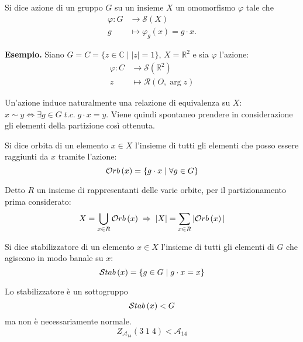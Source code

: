 \begin{multicols}{2}
\begin{definition}[Azione]
	Si dice azione di un gruppo $ G $ su un insieme $ X $ un omomorfismo $ \varphi $ tale che \begin{align*}
	\varphi \colon G &\to \mathcal{S}\left(X\right) \\
	g &\mapsto \varphi_g(x) = g \cdot x.
	\end{align*}
\end{definition}

\textbf{Esempio.} Siano $ G = C = \{ z \in \mathbb{C} \mid |z| = 1 \} $, $ X = \mathbb{R}^2 $ e sia $ \varphi $ l'azione: \begin{align*}
\varphi \colon C &\to \mathcal{S}\left(\mathbb{R}^2\right) \\
z &\mapsto \mathcal{R}(O, \arg z)
\end{align*}

\begin{remark}
	Un'azione induce naturalmente una relazione di equivalenza su $ X $: $ x \sim y \Leftrightarrow \exists g \in G \; t.c.\; g \cdot x = y $. Viene quindi spontaneo prendere in considerazione gli elementi della partizione così ottenuta. 
\end{remark}
\begin{definition}[Orbita]
	Si dice orbita di un elemento $ x \in X $ l'insieme di tutti gli elementi che posso essere raggiunti da $ x $ tramite l'azione: \[ \mathcal{O}rb\left( x \right) = \{ g \cdot x \mid \forall g \in G \} \]
\end{definition}
\begin{remark}
	Detto $ R $ un insieme di rappresentanti delle varie orbite, per il partizionamento prima considerato: \[ X = \bigcup_{x \in R} \mathcal{O}rb\left( x \right) \;\Rightarrow\; |X| = \sum_{x \in R} |\mathcal{O}rb\left( x \right)| \]
\end{remark}

\begin{definition}[Stabilizzatore]
	Si dice stabilizzatore di un elemento $ x \in X $ l'insieme di tutti gli elementi di $ G $ che agiscono in modo banale su $ x $: \[ \mathcal{S}tab\left( x \right) = \{ g \in G \mid g \cdot x = x \} \]
\end{definition}
\begin{remark}
	Lo stabilizzatore è un sottogruppo $$ \mathcal{S}tab\left( x \right) < G $$ ma non è necessariamente normale. $$  Z_{\mathcal{A}_{14}}(3 \; 1 \; 4) < \mathcal{A}_{14}$$
\end{remark}


\end{multicols}
